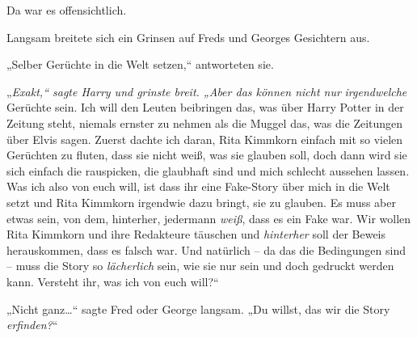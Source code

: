 Da war es offensichtlich.

Langsam breitete sich ein Grinsen auf Freds und Georges Gesichtern aus.

„Selber Gerüchte in die Welt setzen,“ antworteten sie.

„\emph{Exakt,“ sagte Harry und grinste breit. „Aber das können nicht nur} \emph{irgendwelche} Gerüchte sein. Ich will den Leuten beibringen das, was über Harry Potter in der Zeitung steht, niemals ernster zu nehmen als die Muggel das, was die Zeitungen über Elvis sagen. Zuerst dachte ich daran, Rita Kimmkorn einfach mit so vielen Gerüchten zu fluten, dass sie nicht weiß, was sie glauben soll, doch dann wird sie sich einfach die rauspicken, die glaubhaft sind und mich schlecht aussehen lassen. Was ich also von euch will, ist dass ihr eine Fake-Story über mich in die Welt setzt und Rita Kimmkorn irgendwie dazu bringt, sie zu glauben. Es muss aber etwas sein, von dem, hinterher, jedermann \emph{weiß}, dass es ein Fake war. Wir wollen Rita Kimmkorn und ihre Redakteure täuschen und \emph{hinterher} soll der Beweis herauskommen, dass es falsch war. Und natürlich -- da das die Bedingungen sind -- muss die Story so \emph{lächerlich} sein, wie sie nur sein und doch gedruckt werden kann. Versteht ihr, was ich von euch will?“

„Nicht ganz…“ sagte Fred oder George langsam. „Du willst, das wir die Story \emph{erfinden?}“


